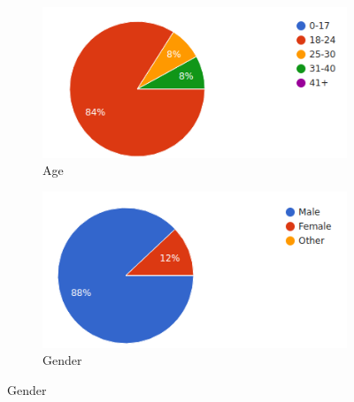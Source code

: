 \begin{figure}[ht]
  \centering
  \begin{subfigure}[b]{0.45\textwidth}
\label{fig:age}
    \includegraphics[width=\textwidth]{figures/stats/age.png}
    \caption{Age}
  \end{subfigure}
  \quad
  \begin{subfigure}[b]{0.45\textwidth}
\label{fig:gender}
    \includegraphics[width=\textwidth]{figures/stats/gender.png}
    \caption{Gender}
  \end{subfigure}


\end{figure}
